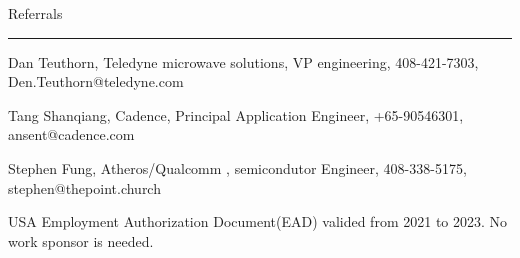 { \medbreak } { \FFbg
Referrals
}
{ \smallbreak } {\par\noindent\hrule} { \smallbreak }

Dan Teuthorn, 
Teledyne microwave solutions, VP engineering,
408-421-7303,
Den.Teuthorn@teledyne.com

Tang Shanqiang,
Cadence,
Principal Application Engineer,
+65-90546301,
ansent@cadence.com

Stephen Fung,
Atheros/Qualcomm , semicondutor Engineer,
408-338-5175,
stephen@thepoint.church



{ \medbreak } 
{ %
USA Employment Authorization Document(EAD) valided from 2021 to 2023.
No work sponsor is needed.
}

\break

\bye
